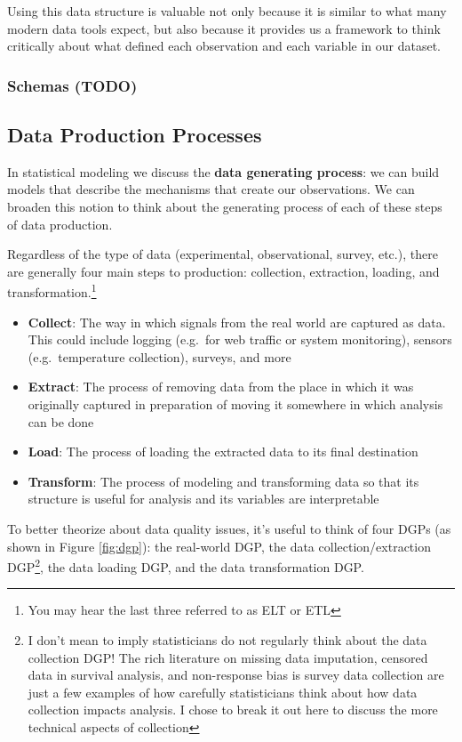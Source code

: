 \documentclass[
]{krantz}
\providecommand{\tightlist}{%
  \setlength{\itemsep}{0pt}\setlength{\parskip}{0pt}}
\begin{document}
Using this data structure is valuable not only because it is similar to what many modern data tools expect, but also because it provides us a framework to think critically about what defined each observation and each variable in our dataset.

\hypertarget{schemas-todo}{%
\subsubsection{Schemas (TODO)}\label{schemas-todo}}

\hypertarget{data-production-processes}{%
\subsection{Data Production Processes}\label{data-production-processes}}

In statistical modeling we discuss the \textbf{data generating process}: we can build models that describe the mechanisms that create our observations.
We can broaden this notion to think about the generating process of each of these steps of data production.

Regardless of the type of data (experimental, observational, survey, etc.), there are generally four main steps to production: collection, extraction, loading, and transformation.\footnote{You may hear the last three referred to as ELT or ETL}

\begin{itemize}
\tightlist
\item
  \textbf{Collect}: The way in which signals from the real world are captured as data. This could include logging (e.g.~for web traffic or system monitoring), sensors (e.g.~temperature collection), surveys, and more
\item
  \textbf{Extract}: The process of removing data from the place in which it was originally captured in preparation of moving it somewhere in which analysis can be done
\item
  \textbf{Load}: The process of loading the extracted data to its final destination
\item
  \textbf{Transform}: The process of modeling and transforming data so that its structure is useful for analysis and its variables are interpretable
\end{itemize}

To better theorize about data quality issues, it's useful to think of four DGPs (as shown in Figure \ref{fig:dgp}): the real-world DGP, the data collection/extraction DGP\footnote{I don't mean to imply statisticians do not regularly think about the data collection DGP! The rich literature on missing data imputation, censored data in survival analysis, and non-response bias is survey data collection are just a few examples of how carefully statisticians think about how data collection impacts analysis. I chose to break it out here to discuss the more technical aspects of collection}, the data loading DGP, and the data transformation DGP.
\end{document}
